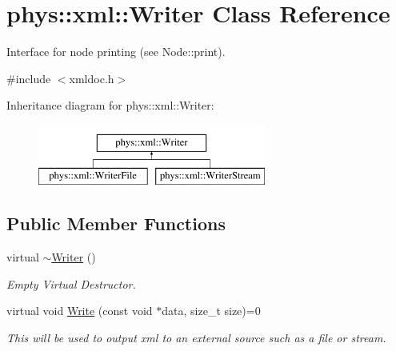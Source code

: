 \hypertarget{classphys_1_1xml_1_1Writer}{
\section{phys::xml::Writer Class Reference}
\label{d2/d28/classphys_1_1xml_1_1Writer}
}


Interface for node printing (see Node::print).  




{\ttfamily \#include $<$xmldoc.h$>$}

Inheritance diagram for phys::xml::Writer:\begin{figure}[H]
\begin{center}
\leavevmode
\includegraphics[height=2cm]{d2/d28/classphys_1_1xml_1_1Writer}
\end{center}
\end{figure}
\subsection*{Public Member Functions}
\begin{DoxyCompactItemize}
\item 
\hypertarget{classphys_1_1xml_1_1Writer_a527c2e01738b1e570d08674eada21800}{
virtual \hyperlink{classphys_1_1xml_1_1Writer_a527c2e01738b1e570d08674eada21800}{$\sim$Writer} ()}
\label{d2/d28/classphys_1_1xml_1_1Writer_a527c2e01738b1e570d08674eada21800}

\begin{DoxyCompactList}\small\item\em Empty Virtual Destructor. \item\end{DoxyCompactList}\item 
virtual void \hyperlink{classphys_1_1xml_1_1Writer_ab6d4758ab53743f236eb64d5b2dd7e9e}{Write} (const void $\ast$data, size\_\-t size)=0
\begin{DoxyCompactList}\small\item\em This will be used to output xml to an external source such as a file or stream. \item\end{DoxyCompactList}\end{DoxyCompactItemize}


